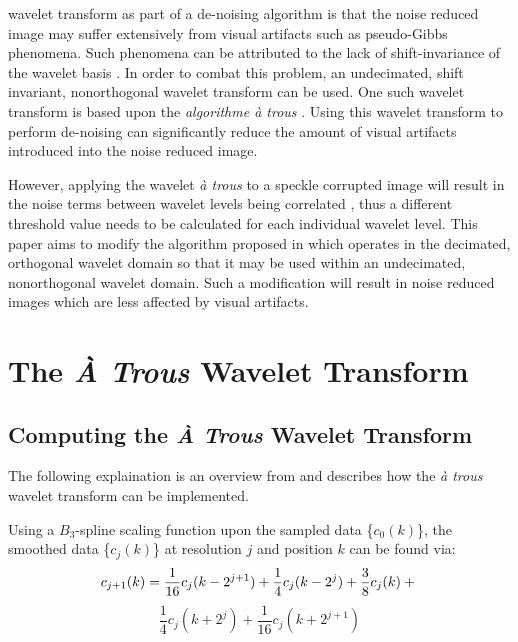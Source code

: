 \documentclass[twocolumn]{article}
\begin{document}
wavelet transform as part of a de-noising
algorithm is that the noise reduced image may suffer extensively from visual artifacts such as pseudo-Gibbs phenomena. 
Such phenomena can be attributed to the lack of shift-invariance of the wavelet basis \cite{coifman95}. 
In order to combat this problem, an undecimated, shift invariant, nonorthogonal
wavelet transform can be used. One such
wavelet transform is based upon the \emph{algorithme \`a trous} \cite{stark95, holdschneider89}. 
Using this wavelet transform 
to perform de-noising can significantly reduce the amount of visual artifacts introduced into the noise reduced 
image. 
\par However, applying the wavelet \emph{\`a trous} to a speckle corrupted image will result in the 
noise terms between wavelet levels being correlated \cite{lang96},
thus a different threshold value needs to be calculated for each individual wavelet level.
This paper aims to modify the algorithm proposed in \cite{yu96} which operates in the 
decimated, orthogonal wavelet
domain so that it may be used within an undecimated, 
nonorthogonal wavelet domain. Such a 
modification will result in noise reduced images which are less affected by visual artifacts.  

\section{The {\em \`A Trous} Wavelet Transform}
\subsection{Computing the {\em \`A Trous} Wavelet Transform}
The following explaination is an overview from \cite{stark95, stark98} and describes how the \emph{\`a trous} wavelet
transform can be implemented. 

Using a $B_{3}$-spline scaling function upon the sampled data \{$c_{0}(k)$\},
the smoothed data \{$c_{j}(k)$\} at resolution $j$ and 
position $k$ can be found via:
\begin{displaymath}
	c_{j+1}(k) =	\frac{1}{16}c_{j}(k-2^{j+1})+\frac{1}{4}c_{j}(k-2^{j})+
			\frac{3}{8}c_{j}(k)+ \\
\end{displaymath}
\begin{equation}
			\frac{1}{4}c_{j}(k+2^{j})+\frac{1}{16}c_{j}(k+2^{j+1})
\end{equation}
\end{document}
